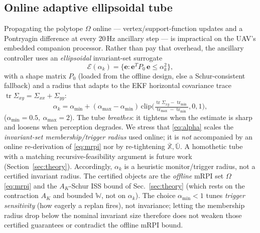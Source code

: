 \documentclass[letterpaper, 10 pt, conference]{ieeeconf}  %
\DeclareMathOperator{\tr}{tr}
\begin{document}
\subsection{Online adaptive ellipsoidal tube}
Propagating the polytope $\Omega$ online --- vertex/support-function updates and a
Pontryagin difference at every $20$\,Hz ancillary step --- is impractical on the UAV's
embedded companion processor. Rather than pay that overhead, the ancillary controller uses
an \emph{ellipsoidal} invariant-set surrogate
\begin{equation}
\mathcal{E}(\alpha_k)=\{\mathbf{e}: \mathbf{e}^T P_0\,\mathbf{e}\le\alpha_k^2\},
\label{eq:ellipsoid}
\end{equation}
with a shape matrix $P_0$ (loaded from the offline design, else a Schur-consistent
fallback) and a radius that adapts to the EKF horizontal covariance trace
$\tr\Sigma_{xy}=\Sigma_{xx}+\Sigma_{yy}$:
\begin{equation}
\alpha_k=\alpha_{\min}+(\alpha_{\max}-\alpha_{\min})\,
\mathrm{clip}\!\Big(\tfrac{\tr\Sigma_{xy}-\tr_{\min}}{\tr_{\max}-\tr_{\min}},0,1\Big),
\label{eq:alpha}
\end{equation}
($\alpha_{\min}=0.5,\ \alpha_{\max}=2$). The tube \emph{breathes}: it tightens
when the estimate is sharp and loosens when perception degrades. We stress that
\eqref{eq:alpha} scales the \emph{invariant-set membership/trigger radius} used
online; it is \emph{not} accompanied by an online re-derivation of
\eqref{eq:mrpi} nor by re-tightening $\bar{\mathbb{X}},\bar{\mathbb{U}}$. A
homothetic tube with a matching recursive-feasibility argument is future work
(Section~\ref{sec:theory}).
Accordingly, $\alpha_k$ is a heuristic monitor/trigger radius, not a certified
invariant radius. The certified objects are the \emph{offline} mRPI set $\Omega$
\eqref{eq:mrpi} and the $A_K$-Schur ISS bound of Sec.~\ref{sec:theory} (which rests
on the contraction $A_K$ and bounded $\mathbb{W}$, not on $\alpha_k$). The choice
$\alpha_{\min}<1$ tunes \emph{trigger sensitivity} (how eagerly a replan fires),
not invariance; letting the membership radius drop below the nominal invariant size
therefore does not weaken those certified guarantees or contradict the offline mRPI
bound.
\end{document}
